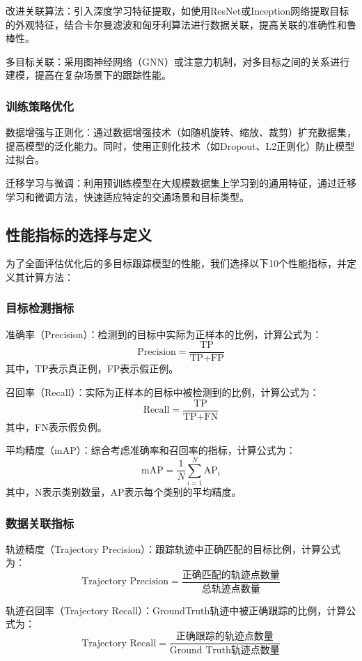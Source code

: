 改进关联算法：引入深度学习特征提取，如使用ResNet或Inception网络提取目标的外观特征，结合卡尔曼滤波和匈牙利算法进行数据关联，提高关联的准确性和鲁棒性。

多目标关联：采用图神经网络（GNN）或注意力机制，对多目标之间的关系进行建模，提高在复杂场景下的跟踪性能\cite{sadeghian2017tracking}。

\subsubsection{训练策略优化}

数据增强与正则化：通过数据增强技术（如随机旋转、缩放、裁剪）扩充数据集，提高模型的泛化能力。同时，使用正则化技术（如Dropout、L2正则化）防止模型过拟合。

迁移学习与微调：利用预训练模型在大规模数据集上学习到的通用特征，通过迁移学习和微调方法，快速适应特定的交通场景和目标类型\cite{yu2021deep}。


\subsection{性能指标的选择与定义}

为了全面评估优化后的多目标跟踪模型的性能，我们选择以下10个性能指标，并定义其计算方法：

\subsubsection{目标检测指标}
准确率（Precision）：检测到的目标中实际为正样本的比例，计算公式为：
\[\text{Precision} = \frac{\text{TP}}{\text{TP} + \text{FP}}\]
其中，TP表示真正例，FP表示假正例。

召回率（Recall）：实际为正样本的目标中被检测到的比例，计算公式为：
\[\text{Recall} = \frac{\text{TP}}{\text{TP} + \text{FN}}\]
其中，FN表示假负例。

平均精度（mAP）：综合考虑准确率和召回率的指标，计算公式为：
\[\text{mAP} = \frac{1}{N} \sum_{i=1}^{N} \text{AP}_i\]
其中，N表示类别数量，AP表示每个类别的平均精度。

\subsubsection{数据关联指标}
轨迹精度（Trajectory Precision）：跟踪轨迹中正确匹配的目标比例，计算公式为：
\[\text{Trajectory Precision} = \frac{\text{正确匹配的轨迹点数量}}{\text{总轨迹点数量}}\]

轨迹召回率（Trajectory Recall）：GroundTruth轨迹中被正确跟踪的比例，计算公式为：
\[\text{Trajectory Recall} = \frac{\text{正确跟踪的轨迹点数量}}{\text{Ground Truth轨迹点数量}}\]

